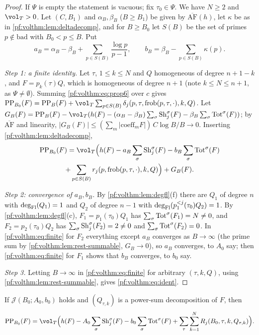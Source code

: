 \begin{proof}
If $\Psi$ is empty the statement is vacuous; fix $\tau_0\in\Psi$. We have $N\ge2$ and $\vol_T>0$. Let
$(C,B_1)$ and $\alpha_B,\beta_B$ ($B\ge B_1$) be given by $\overline{\mathrm{AF}}(h)$, let $\kappa$ be as in
\cref{pf:volthm:lem:deltadecomp}, and for $B\ge B_0$ let $S(B)$ be the set of primes $p\notin\mathrm{bad}$ with
$B_0<p\le B$. Put
\[
a_B=\alpha_B-\beta_B+\sum_{p\in S(B)}\frac{\log p}{p-1},\qquad b_B=\beta_B-\sum_{p\in S(B)}\kappa(p).
\]

\emph{Step 1: a finite identity.} Let $\tau$, $1\le k\le N$ and $Q$ homogeneous of degree $n+1-k$, and $F=p_k(\tau)Q$,
which is homogeneous of degree $n+1$ (note $k\le N\le n+1$, as $\Psi\ne\emptyset$). Summing \eqref{pf:volthm:eq:prop6} over $c$ gives
$\volthmPP_{B_0}(F)=\volthmPP_B(F)+\vol_T\sum_{p\in S(B)}\delta_j(p,\tau,\mathrm{frob}(p,\tau,\cdot),k,Q)$. Let
$G_B(F)=\volthmPP_B(F)-\vol_T(h(F)-(\alpha_B-\beta_B)\sum_\sigma\volthmSh_j^\sigma(F)-\beta_B\sum_\sigma\volthmTot^\sigma(F))$;
by $\overline{\mathrm{AF}}$ and linearity, $|G_B(F)|\le(\sum_m|\mathrm{coeff}_m F|)\,C\log B/B\to0$. Inserting
\cref{pf:volthm:lem:deltadecomp},
\begin{multline}\label{pf:volthm:eq:finite}
\volthmPP_{B_0}(F)=\vol_T\Bigl(h(F)-a_B\sum_\sigma\volthmSh_j^\sigma(F)-b_B\sum_\sigma\volthmTot^\sigma(F)\\
+\sum_{p\in S(B)}r_j(p,\mathrm{frob}(p,\tau,\cdot),k,Q)\Bigr)+G_B(F).
\end{multline}

\emph{Step 2: convergence of $a_B,b_B$.} By \cref{pf:volthm:lem:degfl}(f) there are $Q_1$ of degree $n$ with
$\deg_{\mathrm{Fl}}(Q_1)=1$ and $Q_2$ of degree $n-1$ with $\deg_{\mathrm{Fl}}(p^{<j}_1(\tau_0)Q_2)=1$. By
\cref{pf:volthm:lem:degfl}(c), $F_1=p_1(\tau_0)Q_1$ has $\sum_\sigma\mathrm{Tot}^\sigma(F_1)=N\ne0$, and $F_2=p_2(\tau_0)Q_2$
has $\sum_\sigma\mathrm{Sh}_j^\sigma(F_2)=2\ne0$ and $\sum_\sigma\mathrm{Tot}^\sigma(F_2)=0$. In \eqref{pf:volthm:eq:finite} for
$F_2$ everything except $a_B$ converges as $B\to\infty$ (the prime sum by \cref{pf:volthm:lem:rest-summable},
$G_B\to0$), so $a_B$ converges, to $A_0$ say; then \eqref{pf:volthm:eq:finite} for $F_1$ shows that $b_B$
converges, to $b_0$ say.

\emph{Step 3.} Letting $B\to\infty$ in \eqref{pf:volthm:eq:finite} for arbitrary $(\tau,k,Q)$, using
\cref{pf:volthm:lem:rest-summable}, gives \eqref{pf:volthm:eq:ident}.
\end{proof}

\begin{lemma}\label{pf:volthm:lem:identexp}
If $\mathcal J(B_0;A_0,b_0)$ holds and $(Q_{\tau,k})$ is a power-sum decomposition of $F$, then
\[
\volthmPP_{B_0}(F)=\vol_T\Bigl(h(F)-A_0\sum_\sigma\volthmSh_j^\sigma(F)-b_0\sum_\sigma\volthmTot^\sigma(F)+
\sum_\tau\sum_{k=1}^NR_j(B_0,\tau,k,Q_{\tau,k})\Bigr).
\]
\end{lemma}

